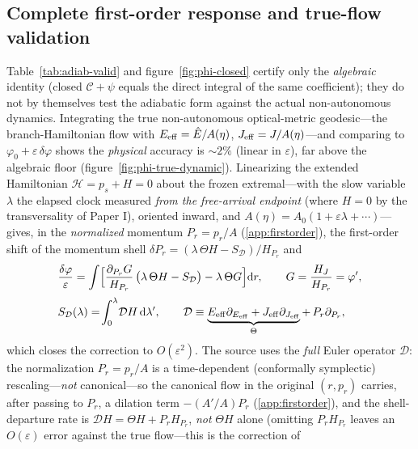 \documentclass[12pt]{iopart}
\theoremstyle{plain}
\theoremstyle{definition}
\theoremstyle{remark}
\newcommand{\Ehat}{\hat E}
\newcommand{\dd}{\mathrm{d}}
\begin{document}
\subsection{Complete first-order response and true-flow validation}
Table~\ref{tab:adiab-valid}
and figure~\ref{fig:phi-closed} certify only the \emph{algebraic} identity (closed
$\mathcal{C}+\psi$ equals the direct integral of the same coefficient); they do not by
themselves test the adiabatic form against the actual non-autonomous dynamics. Integrating
the true non-autonomous optical-metric geodesic---the branch-Hamiltonian flow with
$E_{\rm eff}=\Ehat/A(\eta)$, $J_{\rm eff}=J/A(\eta)$---and comparing to
$\varphi_0+\varepsilon\,\delta\varphi$ shows the \emph{physical} accuracy is $\sim2\%$
(linear in $\varepsilon$), far above the algebraic floor
(figure~\ref{fig:phi-true-dynamic}). Linearizing the extended Hamiltonian
$\mathcal H=p_s+H=0$ about the frozen extremal---with the slow variable
$\lambda$ the elapsed clock measured \emph{from the free-arrival endpoint} (where
$H=0$ by the transversality of Paper I), oriented inward, and
$A(\eta)=A_0(1+\varepsilon\lambda+\cdots)$---gives, in the \emph{normalized} momentum
$P_r=p_r/A$ (\ref{app:firstorder}), the first-order shift of the momentum shell
$\delta P_r=(\lambda\,\Theta H-S_{\mathcal D})/H_{P_r}$ and
\begin{equation}
    \begin{aligned}
    &\frac{\delta\varphi}{\varepsilon}=\int\!\Big[\frac{\partial_{P_r}G}{H_{P_r}}\,
    \big(\lambda\,\Theta H-S_{\mathcal D}\big)-\lambda\,\Theta G\Big]\dd r,\qquad
    G=\frac{H_J}{H_{P_r}}=\varphi',\\[2pt]
    &S_{\mathcal D}(\lambda)=\!\int_0^{\lambda}\!\mathcal D H\,\dd\lambda',\qquad
    \mathcal D\equiv\underbrace{E_{\rm eff}\partial_{E_{\rm eff}}+J_{\rm eff}\partial_{J_{\rm eff}}}_{\Theta}
    +\,P_r\partial_{P_r},
    \end{aligned}
    \label{eq:adiab-exact}
\end{equation}
which closes the correction to $O(\varepsilon^2)$. The source uses the \emph{full} Euler
operator $\mathcal D$: the normalization $P_r=p_r/A$ is a time-dependent (conformally
symplectic) rescaling---\emph{not} canonical---so the canonical flow in the original
$(r,p_r)$ carries, after passing to $P_r$, a dilation term
$-\!\left(A'/A\right)P_r$ (\ref{app:firstorder}), and the shell-departure rate is $\mathcal D H=\Theta
H+P_r H_{P_r}$, \emph{not} $\Theta H$ alone (omitting $P_r H_{P_r}$ leaves an
$O(\varepsilon)$ error against the true flow---this is the correction of
\end{document}
